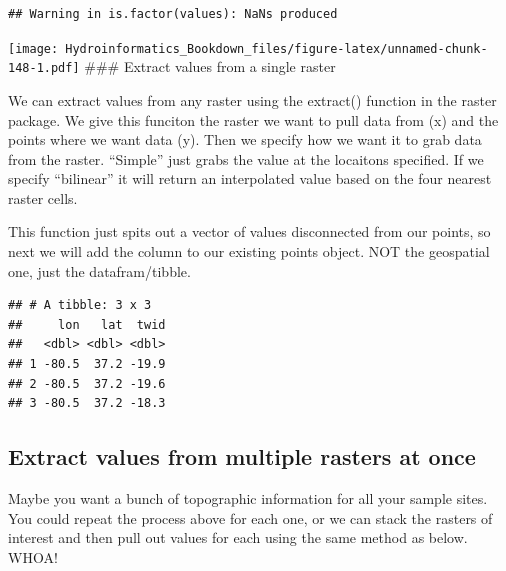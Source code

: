 \documentclass[
]{book}
\newenvironment{Shaded}{\begin{snugshade}}{\end{snugshade}}
\newcommand{\AttributeTok}[1]{\textcolor[rgb]{0.77,0.63,0.00}{#1}}
\newcommand{\CommentTok}[1]{\textcolor[rgb]{0.56,0.35,0.01}{\textit{#1}}}
\newcommand{\FunctionTok}[1]{\textcolor[rgb]{0.00,0.00,0.00}{#1}}
\newcommand{\NormalTok}[1]{#1}
\newcommand{\OtherTok}[1]{\textcolor[rgb]{0.56,0.35,0.01}{#1}}
\newcommand{\SpecialCharTok}[1]{\textcolor[rgb]{0.00,0.00,0.00}{#1}}
\newcommand{\StringTok}[1]{\textcolor[rgb]{0.31,0.60,0.02}{#1}}
\begin{document}
\begin{verbatim}
## Warning in is.factor(values): NaNs produced
\end{verbatim}

\texttt{[image: Hydroinformatics\_Bookdown\_files/figure-latex/unnamed-chunk-148-1.pdf]}
\#\#\# Extract values from a single raster

We can extract values from any raster using the extract() function in the raster package. We give this funciton the raster we want to pull data from (x) and the points where we want data (y). Then we specify how we want it to grab data from the raster. ``Simple'' just grabs the value at the locaitons specified. If we specify ``bilinear'' it will return an interpolated value based on the four nearest raster cells.

This function just spits out a vector of values disconnected from our points, so next we will add the column to our existing points object. NOT the geospatial one, just the datafram/tibble.

\begin{Shaded}
\end{Shaded}

\begin{verbatim}
## # A tibble: 3 x 3
##     lon   lat  twid
##   <dbl> <dbl> <dbl>
## 1 -80.5  37.2 -19.9
## 2 -80.5  37.2 -19.6
## 3 -80.5  37.2 -18.3
\end{verbatim}

\hypertarget{extract-values-from-multiple-rasters-at-once}{%
\subsection{Extract values from multiple rasters at once}\label{extract-values-from-multiple-rasters-at-once}}

Maybe you want a bunch of topographic information for all your sample sites. You could repeat the process above for each one, or we can stack the rasters of interest and then pull out values for each using the same method as below. WHOA!
\end{document}
